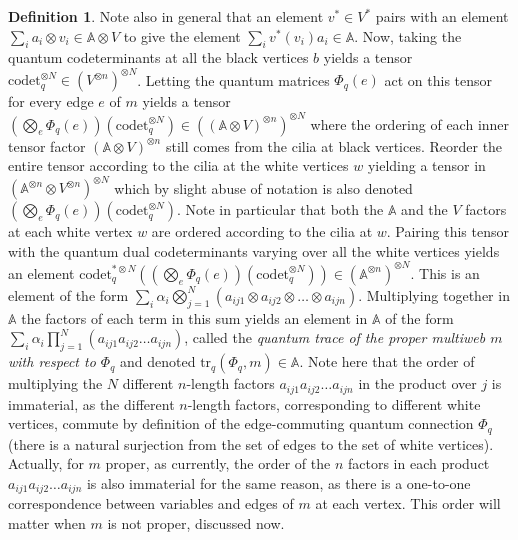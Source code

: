 \documentclass[12pt, reqno]{amsart}
\theoremstyle{definition}
\newtheorem{defi}[theo]{Definition}
\newcommand{\trqc}{\mathrm{tr}_q}%
\begin{document}
\begin{defi}
Note also in general that an element $v^*\in V^*$ pairs with an element $\sum_i a_i\otimes v_i\in\mathbb{A}\otimes V$ to give the element $\sum_i v^*(v_i) a_i\in\mathbb{A}$.  Now, taking the quantum codeterminants at all the black vertices $b$ yields a tensor $\mathrm{codet}_q^{\otimes N}\in(V^{\otimes n})^{\otimes N}$.  Letting the quantum matrices $\Phi_q(e)$ act on this tensor for every edge $e$ of $m$ yields a tensor $(\bigotimes_e\Phi_q(e))(\mathrm{codet}_q^{\otimes N})\in((\mathbb{A}\otimes V)^{\otimes n})^{\otimes N}$ where the ordering of each inner tensor factor $(\mathbb{A}\otimes V)^{\otimes n}$ still comes from the cilia at black vertices.  Reorder the entire tensor according to the cilia at the white vertices $w$ yielding a tensor in $(\mathbb{A}^{\otimes n}\otimes V^{\otimes n})^{\otimes N}$ which by slight abuse of notation is also denoted $(\bigotimes_e\Phi_q(e))(\mathrm{codet}_q^{\otimes N})$.  Note in particular that both the $\mathbb{A}$ and the $V$ factors at each white vertex $w$ are ordered according to the cilia at $w$.  Pairing this tensor with the quantum dual codeterminants varying over all the white vertices yields an element $\mathrm{codet}_q^{*\otimes N}((\bigotimes_e\Phi_q(e))(\mathrm{codet}_q^{\otimes N}))\in(\mathbb{A}^{\otimes n})^{\otimes N}$.  This is an element of the form $\sum_i \alpha_i \bigotimes_{j=1}^N(a_{ij1}\otimes a_{ij2}\otimes\dots\otimes a_{ijn})$.  Multiplying together in $\mathbb{A}$ the factors of each term in this sum yields an element in $\mathbb{A}$ of the form $\sum_i \alpha_i \prod_{j=1}^N(a_{ij1}a_{ij2}\dots a_{ijn})$, called the \emph{quantum trace of the proper multiweb $m$ with respect to $\Phi_q$} and denoted $\trqc(\Phi_q,m)\in\mathbb{A}$.  Note here that the order of multiplying the $N$ different $n$-length factors $a_{ij1}a_{ij2}\dots a_{ijn}$ in the product over $j$ is immaterial, as the different $n$-length factors, corresponding to different white vertices, commute by definition of the edge-commuting quantum connection $\Phi_q$ (there is a natural surjection from the set of edges to the set of white vertices).  Actually, for $m$ proper, as currently, the order of the $n$ factors in each product $a_{ij1}a_{ij2}\dots a_{ijn}$ is also immaterial for the same reason, as there is a one-to-one correspondence between variables and edges of $m$ at each vertex. This order will matter when $m$ is not proper, discussed now.  


\end{defi}
\end{document}
